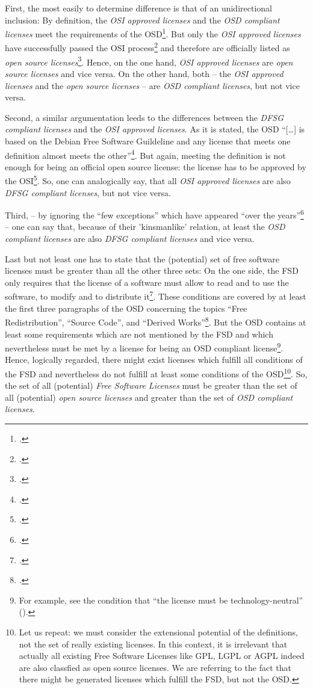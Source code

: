First, the most easily to determine difference is that of an unidirectional
inclusion: By definition, the \emph{OSI approved licenses} and the \emph{OSD
compliant licenses} meet the requirements of the OSD\footcite[cf.][\nopage
wp]{OSI2012a}. But only the \emph{OSI approved licenses} have successfully
passed the OSI process\footcite[cf.][\nopage wp]{OSI2012a} and therefore are
officially listed as \emph{open source licenses}\footcite[cf.][\nopage
wp]{OSI2012b}. Hence, on the one hand, \emph{OSI approved licenses} are
\emph{open source licenses} and vice versa. On the other hand, both -- the
\emph{OSI approved licenses} and the \emph{open source licenses} -- are \emph{OSD
compliant licenses}, but not vice versa.

Second, a similar argumentation leeds to the differences between the
\emph{DFSG compliant licenses} and the \emph{OSI approved licenses}. As it is
stated, the OSD \enquote{[\ldots] is based on the Debian Free Software
Guildeline and any license that meets one definition almost meets the
other}\footcite[cf.][233]{Fogel2006a}. But again, meeting the definition is not
enough for being an official open source license: the license has to be approved
by the OSI\footcite[cf.][\nopage wp]{OSI2012b}. So, one can analogically say,
that all \emph{OSI approved licenses} are also \emph{DFSG compliant licenses},
but not vice versa.

Third, -- by ignoring the \enquote{few exceptions} which have appeared
\enquote{over the years}\footcite[cf.][233]{Fogel2006a} -- one can say that,
because of their 'kinsmanlike' relation, at least the \emph{OSD compliant
licenses} are also \emph{DFSG compliant licenses} and vice versa.

Last but not least one has to state that the (potential) set of free software
licenses must be greater than all the other three sets: On the one side, the FSD
only requires that the license of a software must allow to read and to use the
software, to modify and to distribute it\footcite[cf.][41]{Stallman1996a}. These
conditions are covered by at least the first three paragraphs of the OSD
concerning the topics \enquote{Free Redistribution}, \enquote{Source Code}, and
\enquote{Derived Works}\footcite[cf.][\nopage wp]{OSI2012a}. But the OSD
contains at least some requirements which are not mentioned by the FSD and
which nevertheless must be met by a license for being an OSD compliant
license\footnote{For example, see the condition that \enquote{the license must
be technology-neutral} (\cite[cf.][\nopage wp]{OSI2012a}).}. Hence, logically
regarded, there might exist licenses which fulfill all conditions of the FSD
and nevertheless do not fulfill at least some conditions of the OSD\footnote{
Let us repeat: we must consider the extensional potential of the definitions,
not the set of really existing licenses. In this context, it is irrelevant that
actually all existing Free Software Licenses like GPL, LGPL or AGPL indeed are
also classfied as open source licenses. We are referring to the fact that there
might be generated licenses which fulfill the FSD, but not the OSD.}. So, the
set of all (potential) \emph{Free Software Licenses} must be greater than the
set of all (potential) \emph{open source licenses} and greater than the set of
\emph{OSD compliant licenses}.

